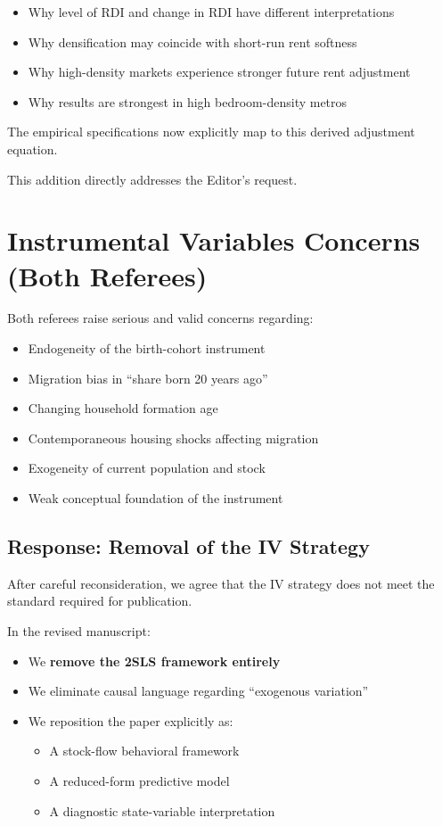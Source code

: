 \documentclass[12pt]{article}
\begin{document}
\begin{itemize}
\item Why level of RDI and change in RDI have different interpretations
\item Why densification may coincide with short-run rent softness
\item Why high-density markets experience stronger future rent adjustment
\item Why results are strongest in high bedroom-density metros
\end{itemize}

The empirical specifications now explicitly map to this derived adjustment equation.

This addition directly addresses the Editor’s request.

\section*{Instrumental Variables Concerns (Both Referees)}

Both referees raise serious and valid concerns regarding:

\begin{itemize}
\item Endogeneity of the birth-cohort instrument
\item Migration bias in “share born 20 years ago”
\item Changing household formation age
\item Contemporaneous housing shocks affecting migration
\item Exogeneity of current population and stock
\item Weak conceptual foundation of the instrument
\end{itemize}

\subsection*{Response: Removal of the IV Strategy}

After careful reconsideration, we agree that the IV strategy does not meet the standard required for publication.

In the revised manuscript:

\begin{itemize}
\item We \textbf{remove the 2SLS framework entirely}
\item We eliminate causal language regarding “exogenous variation”
\item We reposition the paper explicitly as:
  \begin{itemize}
  \item A stock-flow behavioral framework
  \item A reduced-form predictive model
  \item A diagnostic state-variable interpretation
  \end{itemize}
\end{itemize}
\end{document}
